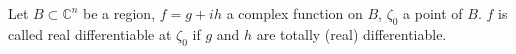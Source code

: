 Let $B \subset \mathbb{C}^n$ be a region, $f = g + ih$ a complex function on $B$, $\zeta_0$ a point of $B$. $f$ is called real differentiable at $\zeta_0$ if $g$ and $h$ are totally (real) differentiable.
